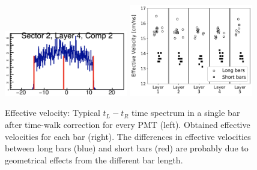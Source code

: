 \documentclass[3p,final,twocolumn]{elsarticle}
\begin{document}
\begin{figure}[tb]
	\centering
		\includegraphics[width=0.48\textwidth]{lr_eff_vel.png}
		\includegraphics[width=0.48\textwidth]{eff_vel.pdf}
	\caption{Effective velocity: Typical $t_{L} - t_{R}$ time spectrum in a single bar after time-walk correction for every PMT (left). Obtained effective velocities for each bar (right). The differences in effective velocities between long bars (blue) and short bars (red) are probably due to geometrical effects from the different bar length.}
	\label{fig:eff_vel}
\end{figure}

\end{document}
